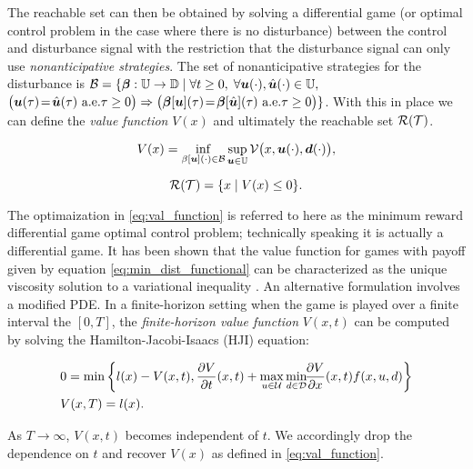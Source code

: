 The reachable set can then be obtained by solving a differential game (or optimal control problem in the case where there is no disturbance) between the control and disturbance signal with the restriction that the disturbance signal can only use  \emph{nonanticipative strategies}. The set of nonanticipative strategies for the disturbance is $\mathcal{B} = \{\bm{\beta}:\mathbb{U}\to\mathbb{D}\;|\;
\forall t\ge 0,\; \forall \bm{u}(\cdot),\hat{\bm{u}}(\cdot)\in\mathbb{U},$
${\big(\bm{u}(\tau) \!=\! \hat{\bm{u}}(\tau)\text{ a.e.} \tau\ge0\big)\Rightarrow
{\big(\bm{\beta}[\bm{u}](\tau) \!=\! \bm{\beta}[\hat{\bm{u}}](\tau)}{\text{ a.e.} \tau\ge0\big)}}\}$. With this in place we can define the \emph{value function} $V(x)$ and ultimately the reachable set $\mathcal{R}(\mathcal{T})$. 

\begin{equation} \label{eq:val_function}
V(x)=\inf_{\beta[\bm{u}](\cdot) \in \mathcal{B}} \sup_{\bm{u} \in \mathbb{U}}\mathcal{V}\big(x,\bm{u}(\cdot),\bm{d}(\cdot)\big),
\end{equation}

\begin{equation} \label{eq:reach_set}
\mathcal{R}(\mathcal{T}) = \{x \mid V(x) \le 0\}.
\end{equation}  

The optimaization in \eqref{eq:val_function} is referred to here as the minimum reward differential game optimal control problem; technically speaking it is actually a differential game. It has been shown that the value function for games with payoff given by equation \eqref{eq:min_dist_functional} can be characterized as the unique viscosity solution to a variational inequality \cite{Barron1989, Barron1990}. An alternative formulation involves a modified PDE\cite{Mitchell2005}. In a finite-horizon setting when the game is played over a finite interval the $[0,T]$, the \emph{finite-horizon value function} $V(x,t)$ can be computed by solving the Hamilton-Jacobi-Isaacs (HJI) equation: 

\begin{equation} \label{eq:HJI}
\begin{split} 
    & 0 = \min\left\{l(x)-V(x,t), \frac{\partial V}{\partial t}(x,t)+ \max_{u\in\mathcal{U}} \min_{ d\in\mathcal{D}} \!\!\frac{\partial V}{\partial x}(x,t) f(x,u, d)\right\}\\
    &V(x,T) = l(x).
\end{split}
\end{equation}


 As $T \rightarrow \infty$, $V(x,t)$ becomes independent of $t$. We accordingly drop the dependence on $t$ and recover $V(x)$ as defined in \eqref{eq:val_function}. 


